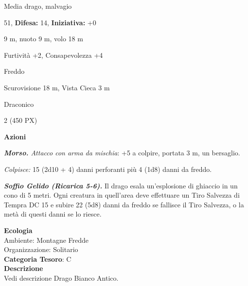 \begin{multicols}{2}
{
\noindent
\begin{description}[noitemsep, topsep=0pt, parsep=0pt, partopsep=0pt, leftmargin=0cm, labelwidth=2.2cm]
	\item[\textbf{Taglia/Tipo:}] Media drago, malvagio
	\item[\textbf{Caratt.:}] 
	\item[\textbf{Punti Ferita:}] 51,  \textbf{Difesa:} 14,  \textbf{Iniziativa:} +0
	\item[\textbf{Movimento:}] 9 m, nuoto 9 m, volo 18 m
	\item[\textbf{Tiri Salvez.:}] 
	\item[\textbf{Comp.:}] Furtività +2, Consapevolezza +4
	\item[\textbf{Imm. Danni:}] Freddo
	\item[\textbf{Sensi:}] Scurovisione 18 m, Vista Cieca 3 m
	\item[\textbf{Linguaggi:}] Draconico
	\item[\textbf{Sfida:}] 2 (450 PX)\smallskip
\end{description}

\textbf{Azioni}

\emph{\textbf{Morso.} Attacco con arma da mischia}: +5 a colpire, portata 3 m, un bersaglio.

\emph{Colpisce:} 15 (2d10 + 4) danni perforanti più 4 (1d8) danni da freddo.

\emph{\textbf{Soffio Gelido (Ricarica 5-6).}} Il drago esala un'esplosione di ghiaccio in un cono di 5 metri. Ogni creatura in quell'area deve effettuare un Tiro Salvezza di Tempra DC 15 e subire 22 (5d8) danni da freddo se fallisce il Tiro Salvezza, o la metà di questi danni se lo riesce.

\textbf{Ecologia}\\
Ambiente: Montagne Fredde\\
Organizzazione: Solitario\\
\textbf{Categoria Tesoro}: C\\
\textbf{Descrizione}\\
Vedi descrizione Drago Bianco Antico.

}
\end{multicols}
